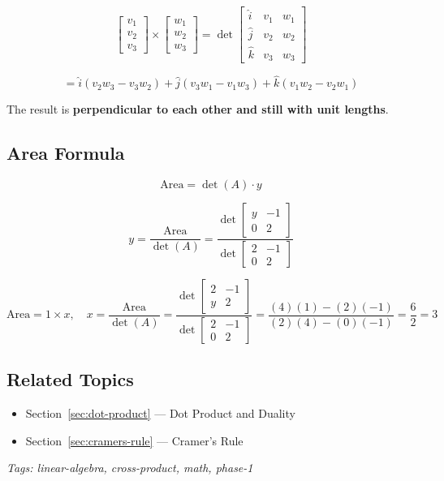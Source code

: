 \[
\begin{bmatrix} v_1 \\ v_2 \\ v_3 \end{bmatrix} \times \begin{bmatrix} w_1 \\ w_2 \\ w_3 \end{bmatrix}
=
\det\begin{bmatrix} \hat{i} & v_1 & w_1 \\ \hat{j} & v_2 & w_2 \\ \hat{k} & v_3 & w_3 \end{bmatrix}
\]

\[
= \hat{i}(v_2 w_3 - v_3 w_2) + \hat{j}(v_3 w_1 - v_1 w_3) + \hat{k}(v_1 w_2 - v_2 w_1)
\]

The result is \textbf{perpendicular to each other and still with unit lengths}.

\subsection{Area Formula}

\[
\text{Area} = \det(A) \cdot y
\]

\[
y = \frac{\text{Area}}{\det(A)}
= \frac{\det\begin{bmatrix} y & -1 \\ 0 & 2 \end{bmatrix}}{\det\begin{bmatrix} 2 & -1 \\ 0 & 2 \end{bmatrix}}
\]

\[
\text{Area} = 1 \times x, \quad
x = \frac{\text{Area}}{\det(A)}
= \frac{\det\begin{bmatrix} 2 & -1 \\ y & 2 \end{bmatrix}}{\det\begin{bmatrix} 2 & -1 \\ 0 & 2 \end{bmatrix}}
= \frac{(4)(1) - (2)(-1)}{(2)(4) - (0)(-1)}
= \frac{6}{2} = 3
\]

\subsection*{Related Topics}
\begin{itemize}[nosep]
  \item Section~\ref{sec:dot-product} --- Dot Product and Duality
  \item Section~\ref{sec:cramers-rule} --- Cramer's Rule
\end{itemize}

\bigskip
\noindent\textit{Tags: linear-algebra, cross-product, math, phase-1}
